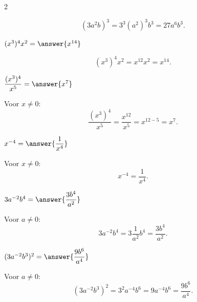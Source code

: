\documentclass{ximera}
\begin{document}
\begin{oefening}[Machten]{\oefB\ESS}
\begin{multicols}{2}
\begin{question}
    \begin{oplossing}
    \[
    (3a^2b)^3
    =3^3(a^2)^3b^3
    =27a^6b^3.
    \]
    \end{oplossing}
    \end{question}
    
    
    \begin{question}
    $(x^3)^4x^2=\answer{x^{14}}$
    
    \begin{oplossing}
    \[
    (x^3)^4x^2
    =x^{12}x^2
    =x^{14}.
    \]
    \end{oplossing}
    \end{question}
    
    
    \begin{question}
    $\dfrac{(x^3)^4}{x^5}
    =\answer{x^7}$
    
    \begin{oplossing}
    Voor $x\neq0$:
    \[
    \dfrac{(x^3)^4}{x^5}
    =\dfrac{x^{12}}{x^5}
    =x^{12-5}
    =x^7.
    \]
    \end{oplossing}
    \end{question}
    
    
    \begin{question}
    $x^{-4}=\answer{\dfrac1{x^4}}$
    
    \begin{oplossing}
    Voor $x\neq0$:
    \[
    x^{-4}
    =\dfrac1{x^4}.
    \]
    \end{oplossing}
    \end{question}
    
    
    \begin{question}
    $3a^{-2}b^4
    =\answer{\dfrac{3b^4}{a^2}}$
    
    \begin{oplossing}
    Voor $a\neq0$:
    \[
    3a^{-2}b^4
    =3\dfrac1{a^2}b^4
    =\dfrac{3b^4}{a^2}.
    \]
    \end{oplossing}
    \end{question}
    
    
    \begin{question}
    $(3a^{-2}b^3)^2
    =\answer{\dfrac{9b^6}{a^4}}$
    
    \begin{oplossing}
    Voor $a\neq0$:
    \[
    (3a^{-2}b^3)^2
    =3^2a^{-4}b^6
    =9a^{-4}b^6
    =\dfrac{9b^6}{a^4}.
    \]
    \end{oplossing}
    \end{question}
    

\end{multicols}
\end{oefening}
\end{document}
